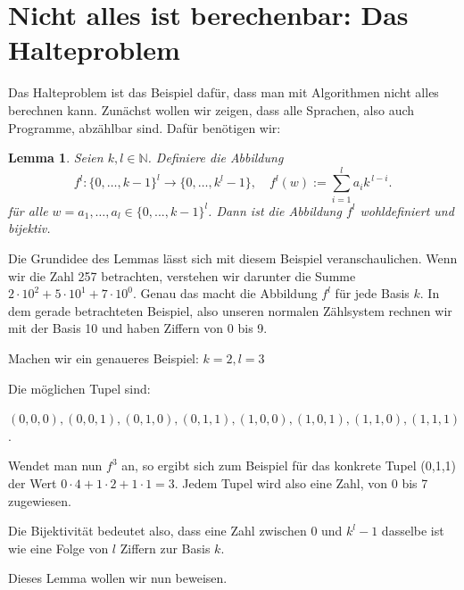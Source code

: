 \documentclass{article}
\newtheorem{lem}[thm]{Lemma}
\begin{document}
\section{Nicht alles ist berechenbar: Das Halteproblem}

Das Halteproblem ist das Beispiel dafür, dass man mit Algorithmen nicht alles berechnen kann. 
Zunächst wollen wir zeigen, dass alle Sprachen, also auch Programme, abzählbar sind.
Dafür benötigen wir:

\begin{lem}
    Seien $k,l \in \mathbb{N}$. Definiere die Abbildung
    \[ 
    f^l: \{0,\dots,k-1\}^l \to \{0,\dots,k^l-1\}, \quad
    f^l(w) := \sum_{i=1}^{l} a_i k^{\,l-i}.
    \]
   für alle \( w = a_1,\dots,a_l \in \{0,...,k-1\}^l \).
    Dann ist die Abbildung $f^l$ wohldefiniert und bijektiv.
\end{lem}

Die Grundidee des Lemmas lässt sich mit diesem Beispiel veranschaulichen. Wenn wir die Zahl 257 betrachten, verstehen wir darunter die Summe $2\cdot 10^2 + 5\cdot 10^1 + 7 \cdot 10^0$. Genau das macht die Abbildung $f^l$ für jede Basis $k$. In dem gerade betrachteten Beispiel, also unseren normalen Zählsystem rechnen wir mit der Basis 10 und haben Ziffern von 0 bis 9.

Machen wir ein genaueres Beispiel: \( k=2, l=3\)

Die möglichen Tupel sind:

\( (0,0,0), (0,0,1), (0,1,0), (0,1,1), (1,0,0), (1,0,1), (1,1,0), (1,1,1) \). 

Wendet man nun $f^3$ an, so ergibt sich zum Beispiel für das konkrete Tupel (0,1,1) der Wert \(
0 \cdot 4 + 1 \cdot 2 + 1 \cdot 1 = 3 \). 
Jedem Tupel wird also eine Zahl, von 0 bis 7 zugewiesen.
\medskip

Die Bijektivität bedeutet also, dass eine Zahl zwischen 0 und $k^l-1$ dasselbe ist wie eine Folge von $l$ Ziffern zur Basis $k$.

\medskip
Dieses Lemma wollen wir nun beweisen.
\end{document}
